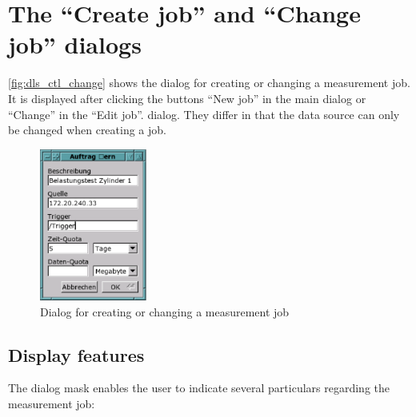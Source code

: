 \documentclass[a4paper,12pt,BCOR6mm,bibtotoc,idxtotoc]{scrbook}
\begin{document}

\section{The ``Create job'' and ``Change job'' dialogs}
\label{sec:manager_auftrag_create}

\autoref{fig:dls_ctl_change} shows the dialog for creating or changing a
measurement job. It is displayed after clicking the buttons ``New job'' in the
main dialog or ``Change'' in the ``Edit job''.  dialog. They differ in that
the data source can only be changed when creating a job.

\begin{figure}[tbh] \begin{center} \includegraphics[width=100pt]{bilder/ctl_change} \end{center} \caption{Dialog for creating or changing a measurement job} \label{fig:dls_ctl_change} \end{figure}


\subsection{Display features}

The dialog mask enables the user to indicate several particulars regarding the measurement job:
\end{document}
